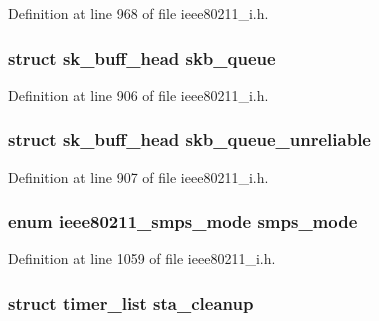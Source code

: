 Definition at line 968 of file ieee80211\-\_\-i.\-h.

\hypertarget{structieee80211__local_a6eeb93345e21d69a77a7c2c571bd0000}{
\subsubsection[{skb\-\_\-queue}]{\setlength{\rightskip}{0pt plus 5cm}struct sk\-\_\-buff\-\_\-head skb\-\_\-queue}}\label{structieee80211__local_a6eeb93345e21d69a77a7c2c571bd0000}


Definition at line 906 of file ieee80211\-\_\-i.\-h.

\hypertarget{structieee80211__local_a98b4c0b5fc65c583926a6c35981287eb}{
\subsubsection[{skb\-\_\-queue\-\_\-unreliable}]{\setlength{\rightskip}{0pt plus 5cm}struct sk\-\_\-buff\-\_\-head skb\-\_\-queue\-\_\-unreliable}}\label{structieee80211__local_a98b4c0b5fc65c583926a6c35981287eb}


Definition at line 907 of file ieee80211\-\_\-i.\-h.

\hypertarget{structieee80211__local_ae5063971b60ec8e964c6776eebe3f04f}{
\subsubsection[{smps\-\_\-mode}]{\setlength{\rightskip}{0pt plus 5cm}enum ieee80211\-\_\-smps\-\_\-mode smps\-\_\-mode}}\label{structieee80211__local_ae5063971b60ec8e964c6776eebe3f04f}


Definition at line 1059 of file ieee80211\-\_\-i.\-h.

\hypertarget{structieee80211__local_a08ed23f945556f2425951c67c8676a06}{
\subsubsection[{sta\-\_\-cleanup}]{\setlength{\rightskip}{0pt plus 5cm}struct timer\-\_\-list sta\-\_\-cleanup}}\label{structieee80211__local_a08ed23f945556f2425951c67c8676a06}


